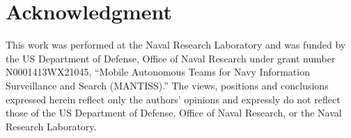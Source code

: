 \documentclass[letterpaper, 10pt, conference]{ieeeconf}
\begin{document}
\section*{Acknowledgment}
This work was performed at the Naval Research Laboratory and was
funded by the US Department of Defense, Office of Naval Research under
grant number N0001413WX21045, ``Mobile Autonomous Teams for Navy
Information Surveillance and Search (MANTISS).'' The views, positions
and conclusions expressed herein reflect only the authors’ opinions
and expressly do not reflect those of the US Department of Defense,
Office of Naval Research, or the Naval Research Laboratory.


 
\end{document}
